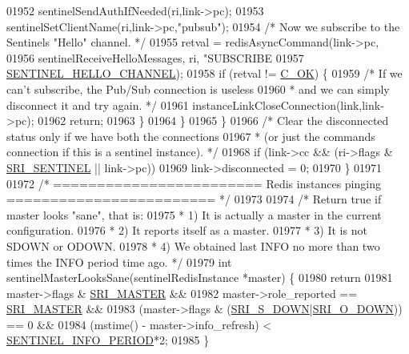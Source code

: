 \begin{DoxyCode}
{{{{{{{{{{{{{{{{{{{{{{{{{{{{{{{{{{{{{{01952             sentinelSendAuthIfNeeded(ri,link->pc);
01953             sentinelSetClientName(ri,link->pc,\textcolor{stringliteral}{"pubsub"});
01954             \textcolor{comment}{/* Now we subscribe to the Sentinels "Hello" channel. */}
01955             retval = redisAsyncCommand(link->pc,
01956                 sentinelReceiveHelloMessages, ri, \textcolor{stringliteral}{"SUBSCRIBE %
01957                     \hyperlink{sentinel_8c_aa57e3638aae4eec03d29f247b1611569}{SENTINEL\_HELLO\_CHANNEL});
01958             \textcolor{keywordflow}{if} (retval != \hyperlink{server_8h_a303769ef1065076e68731584e758d3e1}{C\_OK}) \{
01959                 \textcolor{comment}{/* If we can't subscribe, the Pub/Sub connection is useless}
01960 \textcolor{comment}{                 * and we can simply disconnect it and try again. */}
01961                 instanceLinkCloseConnection(link,link->pc);
01962                 \textcolor{keywordflow}{return};
01963             \}
01964         \}
01965     \}
01966     \textcolor{comment}{/* Clear the disconnected status only if we have both the connections}
01967 \textcolor{comment}{     * (or just the commands connection if this is a sentinel instance). */}
01968     \textcolor{keywordflow}{if} (link->cc && (ri->flags & \hyperlink{sentinel_8c_a8ed55207b2af5d2dd314c951ef253f64}{SRI\_SENTINEL} || link->pc))
01969         link->disconnected = 0;
01970 \}
01971 
01972 \textcolor{comment}{/* ======================== Redis instances pinging  ======================== */}
01973 
01974 \textcolor{comment}{/* Return true if master looks "sane", that is:}
01975 \textcolor{comment}{ * 1) It is actually a master in the current configuration.}
01976 \textcolor{comment}{ * 2) It reports itself as a master.}
01977 \textcolor{comment}{ * 3) It is not SDOWN or ODOWN.}
01978 \textcolor{comment}{ * 4) We obtained last INFO no more than two times the INFO period time ago. */}
01979 \textcolor{keywordtype}{int} sentinelMasterLooksSane(sentinelRedisInstance *master) \{
01980     \textcolor{keywordflow}{return}
01981         master->flags & \hyperlink{sentinel_8c_a2ee83e5ff67b45746cd6a310f15334b2}{SRI\_MASTER} &&
01982         master->role\_reported == \hyperlink{sentinel_8c_a2ee83e5ff67b45746cd6a310f15334b2}{SRI\_MASTER} &&
01983         (master->flags & (\hyperlink{sentinel_8c_a8e26596c8bde451c2dd9cecb2c3046d4}{SRI\_S\_DOWN}|\hyperlink{sentinel_8c_a3bbbca05543cd9d9f86d276e2c7c719c}{SRI\_O\_DOWN})) == 0 &&
01984         (mstime() - master->info\_refresh) < \hyperlink{sentinel_8c_ac6a2144aa06344ed8547176a4e3cfaa5}{SENTINEL\_INFO\_PERIOD}*2;
01985 \}
}}}}}}}}}}}}}}}}}}}}}}}}}}}}}}}}}}}}}}}
\end{DoxyCode}
